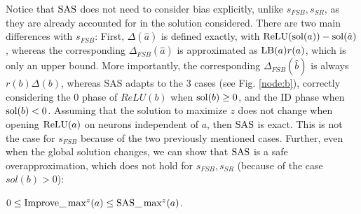 %	
%	
%	
%	



Notice that $\mathrm{SAS}$ does not need to consider bias explicitly, unlike $s_{FSB},s_{SR}$,
as they are already accounted for in the solution considered. 
There are two main differences with $s_{FSB}$: 
First, $\Delta(\hat{a})$ is defined exactly, with $\mathrm{ReLU}(\mathrm{sol}(a))-\mathrm{sol}(\hat{a})$,
whereas the corresponding $\Delta_{FSB}(\hat{a})$ is approximated as $\mathrm{LB}(a) r(a)$, 
which is only an upper bound. %
More importantly, the corresponding $\Delta_{FSB}(\hat{b})$ is always $r(b) \Delta(b)$, whereas SAS adapts to the 3 cases (see Fig. \ref{node:b}), correctly considering the 0 phase of $ReLU(b)$ when $\mathrm{sol}(b)\geq 0$, and the ID phase when $\mathrm{sol}(b)<0$.
Assuming that the solution to maximize $z$ does not change when opening $\mathrm{ReLU}(a)$
on neurons independent of $a$, then $\mathrm{SAS}$ is exact. This is not the case for $s_{FSB}$ because of the two previously mentioned cases. Further, even when the global solution changes, we can show that $\mathrm{SAS}$ is a safe overapproximation, which does not hold for $s_{FSB},s_{SR}$ (because of the case $sol(b) > 0$):



\begin{proposition}
	\label{prop2}
		$0 \leq \mathrm{Improve}\_\max^z(a) \leq \mathrm{SAS}\_\max^z(a)$. 
\end{proposition}


